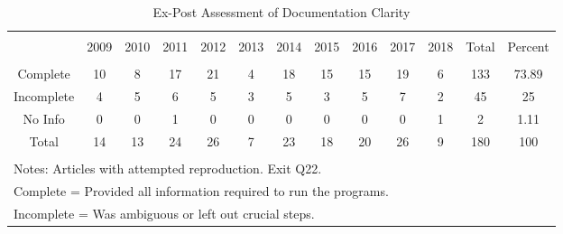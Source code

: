 
\begin{table}[!htbp] \centering 
  \caption{Ex-Post Assessment of Documentation Clarity} 
  \label{tab:doc:yearly} 
\footnotesize 
\begin{tabular}{@{\extracolsep{0.4pt}} ccccccccccccc} 
\\[-1.8ex]\hline 
\hline \\[-1.8ex] 
  & 2009 & 2010 & 2011 & 2012 & 2013 & 2014 & 2015 & 2016 & 2017 & 2018 & Total & Percent \\ 
\hline \\[-1.8ex] 
Complete & 10 & 8 & 17 & 21 & 4 & 18 & 15 & 15 & 19 & 6 & 133 & 73.89 \\ 
Incomplete & 4 & 5 & 6 & 5 & 3 & 5 & 3 & 5 & 7 & 2 & 45 & 25 \\ 
No Info & 0 & 0 & 1 & 0 & 0 & 0 & 0 & 0 & 0 & 1 & 2 & 1.11 \\ 
Total & 14 & 13 & 24 & 26 & 7 & 23 & 18 & 20 & 26 & 9 & 180 & 100 \\ 
\hline \\[-1.8ex] 
\multicolumn{13}{l}{\footnotesize Notes: Articles with attempted reproduction. Exit Q22.} \\ 
\multicolumn{13}{l}{\footnotesize Complete = Provided all information required to run the programs.} \\ 
\multicolumn{13}{l}{\footnotesize Incomplete = Was ambiguous or left out crucial steps.} \\ 
\end{tabular} 
\end{table} 
